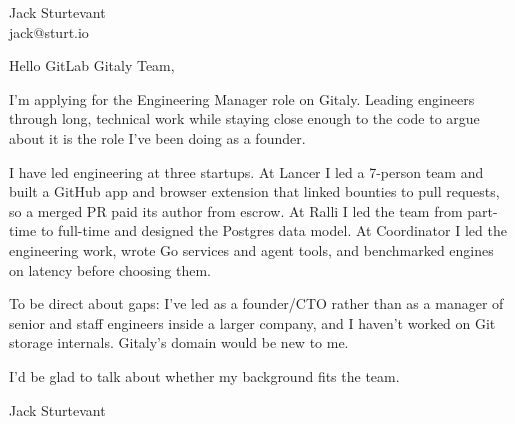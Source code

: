 \documentclass[11pt]{article}
\begin{document}
\raggedright

{\namefont\fontsize{20pt}{24pt}\selectfont Jack Sturtevant}\\[-0.3em]
jack@sturt.io

\vspace{1.2em}

Hello GitLab Gitaly Team,

I'm applying for the Engineering Manager role on Gitaly. Leading engineers through long, technical work while staying close enough to the code to argue about it is the role I've been doing as a founder.

I have led engineering at three startups. At Lancer I led a 7-person team and built a GitHub app and browser extension that linked bounties to pull requests, so a merged PR paid its author from escrow. At Ralli I led the team from part-time to full-time and designed the Postgres data model. At Coordinator I led the engineering work, wrote Go services and agent tools, and benchmarked engines on latency before choosing them.

To be direct about gaps: I've led as a founder/CTO rather than as a manager of senior and staff engineers inside a larger company, and I haven't worked on Git storage internals. Gitaly's domain would be new to me.

I'd be glad to talk about whether my background fits the team.

\vspace{0.6em}
Jack Sturtevant
\end{document}
